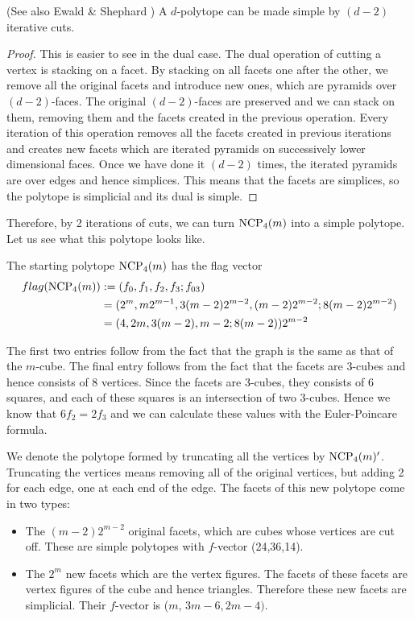  

\begin{lemma}
(See also Ewald \& Shephard \cite{EwSh}) A $d$-polytope can be made simple 
by $(d-2)$ iterative cuts.
\end{lemma}

\begin{proof}
This is easier to see in the dual case. The dual operation of cutting a vertex 
is stacking on a facet. By stacking on all facets one after the other, we 
remove all the original facets and introduce new ones, which are pyramids over 
$(d-2)$-faces. The original $(d-2)$-faces are preserved and we can stack on 
them, removing them and the facets created in the previous operation. Every 
iteration of this operation removes all the facets created in previous 
iterations and creates new facets which are iterated pyramids on successively 
lower dimensional faces. Once we have done it $(d-2)$ times, the iterated 
pyramids are over edges and hence simplices. This means that the facets are 
simplices, so the polytope is simplicial and its dual is simple.
\end{proof}

Therefore, by 2 iterations of cuts, we can turn $\textrm{NCP}_4(m)$ into a simple 
polytope. Let us see what this polytope looks like. 

The starting polytope $\textrm{NCP}_4(m)$ has the flag vector 
\begin{align*}
 flag(\textrm{NCP}_4(m)) &:= (f_0, f_1, f_2, f_3; f_{03}) \\
	&= (2^m, m2^{m-1}, 3(m-2)2^{m-2}, (m-2)2^{m-2}; 8(m-2)2^{m-2}) \\
	&= (4, 2m, 3(m-2), m-2; 8(m-2))2^{m-2}
\end{align*}

The first two entries follow from the fact that the graph is the same as that 
of the $m$-cube. The final entry follows from the fact that the facets are 
3-cubes and hence consists of 8 vertices. Since the facets are 3-cubes, they 
consists of 6 squares, and each of these squares is an intersection of two 
3-cubes. Hence we know that $6f_2 = 2f_3$ and we can calculate these values with 
the Euler-Poincare formula.

We denote the polytope formed by truncating all the vertices by $\textrm{NCP}_4(m)'$.
Truncating the vertices means removing all of the original vertices, but 
adding 2 for each edge, one at each end of the edge. The facets of this new 
polytope come in two types:

\begin{itemize}
 \item The $(m-2)2^{m-2}$ original facets, which are cubes whose vertices are 
cut off. These are simple polytopes with $f$-vector (24,36,14).
 \item The $2^m$ new facets which are the vertex figures. The facets of these 
facets are vertex figures of the cube and hence triangles. Therefore these 
new facets are simplicial. Their $f$-vector is ($m$, 
$3m-6, 2m-4)$.
\end{itemize}

